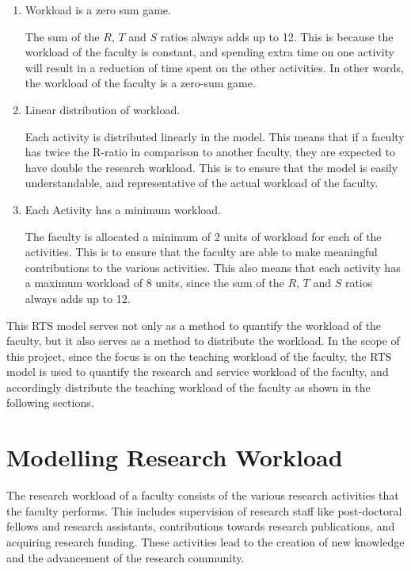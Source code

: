 \begin{enumerate}
  \item Workload is a zero sum game.

        The sum of the $R$, $T$ and $S$ ratios always adds up to 12. This is because the workload of the faculty is constant, and spending extra time on one activity will result in a reduction of time spent on the other activities. In other words, the workload of the faculty is a zero-sum game.

  \item Linear distribution of workload.

        Each activity is distributed linearly in the model. This means that if a faculty has twice the R-ratio in comparison to another faculty, they are expected to have double the research workload. This is to ensure that the model is easily understandable, and representative of the actual workload of the faculty.

  \item Each Activity has a minimum workload.

        The faculty is allocated a minimum of 2 units of workload for each of the activities. This is to ensure that the faculty are able to make meaningful contributions to the various activities. This also means that each activity has a maximum workload of 8 units, since the sum of the $R$, $T$ and $S$ ratios always adds up to 12.

\end{enumerate}

This RTS model serves not only as a method to quantify the workload of the faculty, but it also serves as a method to distribute the workload. In the scope of this project, since the focus is on the teaching workload of the faculty, the RTS model is used to quantify the research and service workload of the faculty, and accordingly distribute the teaching workload of the faculty as shown in the following sections.


\section{Modelling Research Workload}
\label{sec:modelling_research_workload}

The research workload of a faculty consists of the various research activities that the faculty performs. This includes supervision of research staff like post-doctoral fellows and research assistants, contributions towards research publications, and acquiring research funding. These activities lead to the creation of new knowledge and the advancement of the research community.

